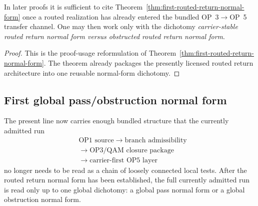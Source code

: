 \begin{corollary}
\label{cor:routed-return-normal-form-use-rule}
In later proofs it is sufficient to cite Theorem~\ref{thm:first-routed-return-normal-form} once a routed realization has already entered the bundled OP~3$\to$OP~5 transfer channel. One may then work only with the dichotomy \emph{carrier-stable routed return normal form versus obstructed routed return normal form}.
\end{corollary}

\begin{proof}
This is the proof-usage reformulation of Theorem~\ref{thm:first-routed-return-normal-form}. The theorem already packages the presently licensed routed return architecture into one reusable normal-form dichotomy.
\end{proof}


\subsection{First global pass/obstruction normal form}
\label{sec:first-global-pass-obstruction-normal-form}

\begin{remark}
The present line now carries enough bundled structure that the currently admitted run
\[
\begin{aligned}
&\text{OP1 source}
\;\to\;\text{branch admissibility}\\[0.15em]
{}&\;\to\;\text{OP3/QAM closure package}\\[0.15em]
{}&\;\to\;\text{carrier-first OP5 layer}
\end{aligned}
\]
no longer needs to be read as a chain of loosely connected local tests. After the routed
return normal form has been established, the full currently admitted run is read only up to
one global dichotomy: a global pass normal form or a global obstruction normal form.
\end{remark}

